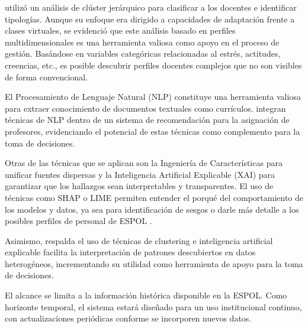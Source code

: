         \textcite{Stevens2023} utilizó un análisis de clúster jerárquico para clasificar a los docentes e identificar tipologías. Aunque su enfoque era dirigido a capacidades de adaptación frente a clases virtuales, se evidenció que este análisis basado en perfiles multidimensionales es una herramienta valiosa como apoyo en el proceso de gestión. Basándose en variables categóricas relacionadas al estrés, actitudes, creencias, etc., es posible descubrir perfiles docentes complejos que no son visibles de forma convencional.

        El Procesamiento de Lenguaje Natural (NLP) constituye una herramienta valiosa para extraer conocimiento de documentos textuales como currículos. \textcite{Quito2025} integran técnicas de NLP dentro de un sistema de recomendación para la asignación de profesores, evidenciando el potencial de estas técnicas como complemento para la toma de decisiones.

        Otras de las técnicas que se aplican son la Ingeniería de Características para unificar fuentes dispersas y la Inteligencia Artificial Explicable (XAI) para garantizar que los hallazgos sean interpretables y transparentes. El uso de técnicas como SHAP o LIME permiten entender el porqué del comportamiento de los modelos y datos, ya sea para identificación de sesgos o darle más detalle a los posibles perfiles de personal de ESPOL \parencite{Magham2024}.

        Asimismo, \textcite{AlvarezGarcia2024} respalda el uso de técnicas de clustering e inteligencia artificial explicable facilita la interpretación de patrones descubiertos en datos heterogéneos, incrementando su utilidad como herramienta de apoyo para la toma de decisiones.

        El alcance se limita a la información histórica disponible en la ESPOL. Como horizonte temporal, el sistema estará diseñado para un uso institucional continuo, con actualizaciones periódicas conforme se incorporen nuevos datos.
